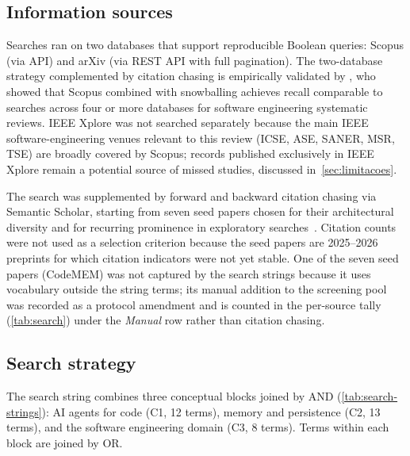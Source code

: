 \subsection{Information sources}
\label{sec:fontes}

Searches ran on two databases that support reproducible Boolean queries:
Scopus (via API) and arXiv (via REST API with full pagination).
The two-database strategy complemented by citation chasing is empirically
validated by \citet{mourao2020hybrid}, who showed that Scopus combined
with snowballing achieves recall comparable to searches across four or
more databases for software engineering systematic reviews.
IEEE Xplore was not searched separately because the main IEEE
software-engineering venues relevant to this review (ICSE, ASE, SANER,
MSR, TSE) are broadly covered by Scopus;
records published exclusively in IEEE Xplore remain a potential source
of missed studies, discussed in~\autoref{sec:limitacoes}.

The search was supplemented by forward and backward citation chasing via
Semantic Scholar, starting from seven seed papers chosen for their
architectural diversity and for recurring prominence in exploratory
searches~\citep{du2026memory,joshi2025swebenchcl,wang2026codemem,deng2026memcoder,wu2025gcc,wang2026improving,lindenbauer2025ctimrover}.
Citation counts were not used as a selection criterion because the
seed papers are 2025--2026 preprints for which citation indicators
were not yet stable.
One of the seven seed papers (CodeMEM) was not captured by the search
strings because it uses vocabulary outside the string terms;
its manual addition to the screening pool was recorded as a protocol
amendment and is counted in the per-source tally (\autoref{tab:search})
under the \textit{Manual} row rather than citation chasing.

\subsection{Search strategy}
\label{sec:search}

The search string combines three conceptual blocks joined by AND
(\autoref{tab:search-strings}): AI agents for code (C1, 12 terms),
memory and persistence (C2, 13 terms), and the software engineering
domain (C3, 8 terms).
Terms within each block are joined by OR.

